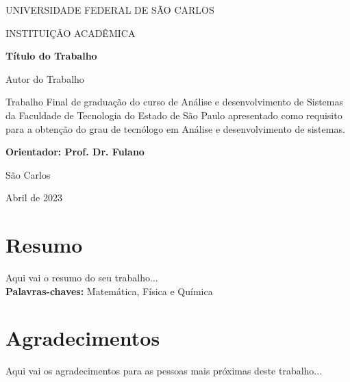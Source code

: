 \documentclass[a4paper, 12pt, oneside]{book}
\begin{document}
\begin{titlepage}

\addtolength{\topmargin}{1.5cm}

\setlength{\baselineskip}{2.0\baselineskip}

\begin{center}

{\large{UNIVERSIDADE FEDERAL DE SÃO CARLOS}}

{\large{INSTITUIÇÃO ACADÊMICA}}
\end{center}

\vspace{2cm}

\begin{center}
{\Large\textbf{Título do Trabalho}}
\end{center}

\vspace{1.5cm}

\begin{center}
{\Large{Autor do Trabalho}}
\end{center}

\vspace{4cm}

\begin{flushright}

\begin{minipage}{12cm}

\hrulefill 

Trabalho Final de graduação do curso de Análise e desenvolvimento de Sistemas da Faculdade de Tecnologia do Estado de São Paulo
apresentado como requisito para a obtenção do grau de tecnólogo em Análise e desenvolvimento de sistemas. 

\hrulefill

{\textbf{Orientador: Prof. Dr. Fulano}}
\end{minipage}

\end{flushright}

\setlength{\baselineskip}{0.7\baselineskip}
\vfill

\begin{center}
São Carlos

Abril de 2023
\end{center}

\end{titlepage}

\chapter*{Resumo}

Aqui vai o resumo do seu trabalho...\\
{\textbf{Palavras-chaves:} Matemática, Física e Química}

\chapter*{Agradecimentos}

Aqui vai os agradecimentos para as pessoas mais próximas deste trabalho...
\end{document}
